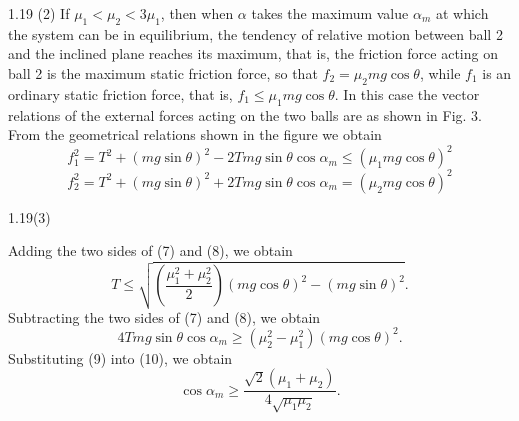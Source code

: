 \begin{solution}{1.19}
(2) If $\mu_1<\mu_2<3\mu_1$, then when $\alpha$ takes the maximum value $\alpha_m$ at which the system can be in equilibrium, the tendency of relative motion between ball 2 and the inclined plane reaches its maximum, that is, the friction force acting on ball 2 is the maximum static friction force, so that $f_2=\mu_2mg\cos\theta$, while $f_1$ is an ordinary static friction force, that is, $f_1\leq\mu_1mg\cos\theta$. In this case the vector relations of the external forces acting on the two balls are as shown in Fig. 3. From the geometrical relations shown in the figure we obtain
\begin{equation}
f_1^2=T^2+(mg\sin\theta)^2-2Tmg\sin\theta\cos\alpha_m\leq(\mu_1mg\cos\theta)^2 \tag{7}
\end{equation}
\begin{equation}
f_2^2=T^2+(mg\sin\theta)^2+2Tmg\sin\theta\cos\alpha_m=(\mu_2mg\cos\theta)^2 \tag{8}
\end{equation}

\begin{figbox}{1.19(3)}
\end{figbox}

Adding the two sides of (7) and (8), we obtain
\begin{equation}
T\leq\sqrt{\left(\frac{\mu_1^2+\mu_2^2}{2}\right)(mg\cos\theta)^2-(mg\sin\theta)^2}. \tag{9}
\end{equation}
Subtracting the two sides of (7) and (8), we obtain
\begin{equation}
4Tmg\sin\theta\cos\alpha_m\geq(\mu_2^2-\mu_1^2)(mg\cos\theta)^2. \tag{10}
\end{equation}
Substituting (9) into (10), we obtain
\[
\cos\alpha_m\geq\frac{\sqrt{2}(\mu_1+\mu_2)}{4\sqrt{\mu_1\mu_2}}.
\]


\end{solution}
